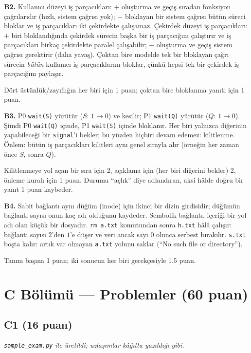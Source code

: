 \documentclass[11pt,a4paper]{article}
\newcommand{\cmd}[1]{\texttt{#1}}
\begin{document}
\textbf{B2.} Kullanıcı düzeyi iş parçacıkları: $+$ oluşturma ve geçiş sıradan fonksiyon çağrılarıdır (hızlı, sistem çağrısı yok); $-$ bloklayan bir sistem çağrısı bütün süreci bloklar ve iş parçacıkları iki çekirdekte çalışamaz. Çekirdek düzeyi iş parçacıkları: $+$ biri bloklandığında çekirdek sürecin başka bir iş parçacığını çalıştırır ve iş parçacıkları birkaç çekirdekte paralel çalışabilir; $-$ oluşturma ve geçiş sistem çağrısı gerektirir (daha yavaş). Çoktan bire modelde tek bir bloklayan çağrı sürecin \emph{bütün} kullanıcı iş parçacıklarını bloklar, çünkü hepsi tek bir çekirdek iş parçacığını paylaşır.
\begin{rubric}Dört üstünlük/zayıflığın her biri için 1 puan; çoktan bire bloklanma yanıtı için 1 puan.\end{rubric}

\textbf{B3.} P0 \texttt{wait(S)} yürütür ($S$: $1 \to 0$) ve kesilir; P1 \texttt{wait(Q)} yürütür ($Q$: $1 \to 0$). Şimdi P0 \texttt{wait(Q)} içinde, P1 \texttt{wait(S)} içinde bloklanır. Her biri yalnızca diğerinin yapabileceği bir \texttt{signal}'i bekler; bu yüzden hiçbiri devam edemez: kilitlenme. Önlem: bütün iş parçacıkları kilitleri aynı genel sırayla alır (örneğin her zaman önce $S$, sonra $Q$).
\begin{rubric}Kilitlenmeye yol açan bir sıra için 2, açıklama için (her biri diğerini bekler) 2, önleme kuralı için 1 puan. Durumu ``açlık'' diye adlandıran, aksi hâlde doğru bir yanıt 1 puan kaybeder.\end{rubric}

\textbf{B4.} Sabit bağlantı aynı düğüm (inode) için ikinci bir dizin girdisidir; düğümün bağlantı sayısı onun kaç adı olduğunu kaydeder. Sembolik bağlantı, içeriği bir yol adı olan küçük bir dosyadır. \cmd{rm a.txt} komutundan sonra \texttt{h.txt} hâlâ çalışır: bağlantı sayısı $2$'den $1$'e düşer ve veri ancak sayı $0$ olunca serbest bırakılır. \texttt{s.txt} boşta kalır: artık var olmayan \texttt{a.txt} yolunu saklar (``No such file or directory'').
\begin{rubric}Tanım başına 1 puan; iki sonucun her biri gerekçesiyle $1.5$ puan.\end{rubric}

\section*{C Bölümü --- Problemler (60 puan)}
\subsection*{C1 (16 puan)}
\textit{\texttt{sample\_exam.py} ile üretildi; uzlaşımlar kâğıtta yazıldığı gibi.}
\end{document}
